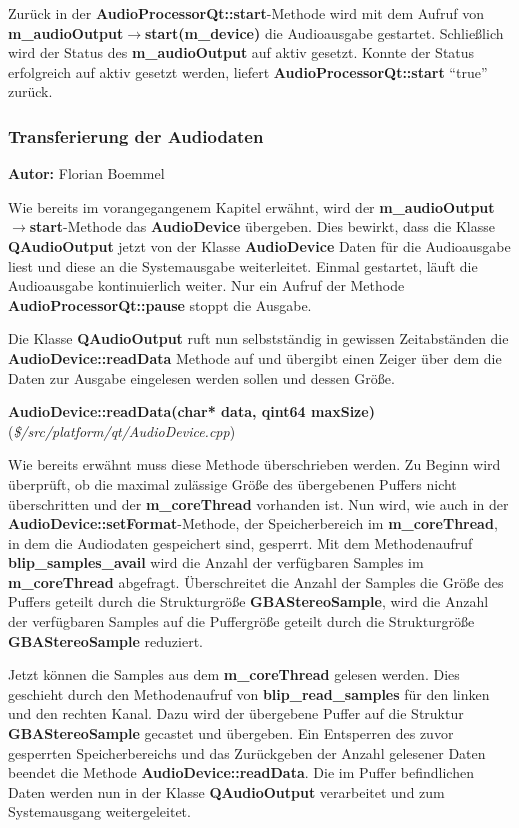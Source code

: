 \documentclass[11pt,a4paper]{scrartcl}
\newcommand{\AutorFlorian} {
    \vspace{-4mm}
    \large \textbf{Autor:} Florian Boemmel \normalsize
    \vspace{2mm}
}
\newcommand{\paratitlecode}[2] {
    \vspace{5mm}
    \large \textbf{#1} \normalsize(\textit{\${#2}})
    \vspace{2mm}\newline
}
\begin{document}
Zur\"uck in der \textbf{AudioProcessorQt::start}-Methode wird mit dem Aufruf von \textbf{m\_audioOutput$\rightarrow$start(m\_device)} die Audioausgabe gestartet. Schlie{\ss}lich wird der Status des \textbf{m\_audioOutput} auf aktiv gesetzt. Konnte der Status erfolgreich auf aktiv gesetzt werden, liefert \textbf{AudioProcessorQt::start} \enquote{true} zur\"uck.
 
\subsubsection{Transferierung der Audiodaten}
\AutorFlorian

Wie bereits im vorangegangenem Kapitel erw\"ahnt, wird der \textbf{m\_audioOutput$\rightarrow$start}-Methode das \textbf{AudioDevice} \"ubergeben. Dies bewirkt, dass die Klasse \textbf{QAudioOutput} jetzt von der Klasse \textbf{AudioDevice} Daten f\"ur die Audioausgabe liest und diese an die Systemausgabe weiterleitet. Einmal gestartet, l\"auft die Audioausgabe kontinuierlich weiter. Nur ein Aufruf der Methode \textbf{AudioProcessorQt::pause} stoppt die Ausgabe.

Die Klasse \textbf{QAudioOutput} ruft nun selbstst\"andig  in gewissen Zeitabst\"anden die \textbf{AudioDevice::readData} Methode auf und \"ubergibt einen Zeiger \"uber dem die Daten zur Ausgabe eingelesen werden sollen und dessen Gr\"o{\ss}e.


\paratitlecode{AudioDevice::readData(char* data, qint64 maxSize)}{/src/platform/qt/AudioDevice.cpp}
Wie bereits erw\"ahnt muss diese Methode \"uberschrieben werden. Zu Beginn wird \"uberpr\"uft, ob die maximal zul\"assige Gr\"o{\ss}e des \"ubergebenen Puffers nicht \"uberschritten und der \textbf{m\_coreThread} vorhanden ist.
Nun wird, wie auch in der \textbf{AudioDevice::setFormat}-Methode, der Speicherbereich im \textbf{m\_coreThread}, in dem die Audiodaten gespeichert sind, gesperrt.
Mit dem Methodenaufruf \textbf{blip\_samples\_avail} wird die Anzahl der verf\"ugbaren Samples im \textbf{m\_coreThread} abgefragt. \"Uberschreitet die Anzahl der Samples die Gr\"o{\ss}e des Puffers geteilt durch die 
Strukturgr\"o{\ss}e \textbf{GBAStereoSample}, wird die Anzahl der verf\"ugbaren Samples auf die Puffergr\"o{\ss}e geteilt durch die Strukturgr\"o{\ss}e \textbf{GBAStereoSample} reduziert.

Jetzt k\"onnen die Samples aus dem \textbf{m\_coreThread} gelesen werden. Dies geschieht durch den Methodenaufruf von \textbf{blip\_read\_samples} f\"ur den linken und den rechten Kanal. 
Dazu wird der \"ubergebene Puffer auf die Struktur \textbf{GBAStereoSample} gecastet und \"ubergeben. Ein Entsperren des zuvor gesperrten Speicherbereichs und das Zur\"uckgeben der Anzahl gelesener Daten beendet die Methode
\textbf{AudioDevice::readData}. Die im Puffer befindlichen Daten werden nun in der Klasse \textbf{QAudioOutput} verarbeitet und zum Systemausgang weitergeleitet.
\end{document}
